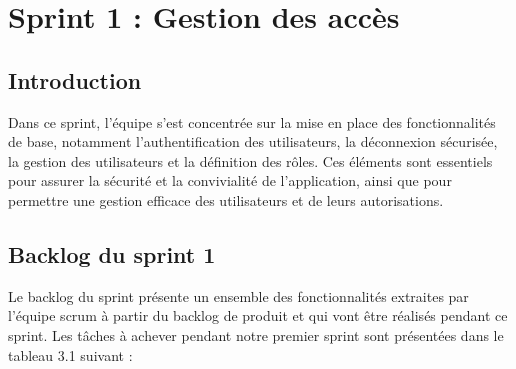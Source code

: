 
\chapter{  Sprint 1 : Gestion des accès}

\section*{Introduction}
Dans ce sprint, l'équipe s'est concentrée sur la mise en place des fonctionnalités de base, notamment l'authentification des utilisateurs, la déconnexion sécurisée, la gestion des utilisateurs et la définition des rôles. Ces éléments sont essentiels pour assurer la sécurité et la convivialité de l'application, ainsi que pour permettre une gestion efficace des utilisateurs et de leurs autorisations.


\section{Backlog du sprint 1}
Le backlog du sprint présente un ensemble des fonctionnalités extraites par l’équipe scrum à partir du backlog de produit et qui vont être réalisés pendant ce sprint. Les tâches à achever
pendant notre premier sprint sont présentées dans le tableau 3.1 suivant :

